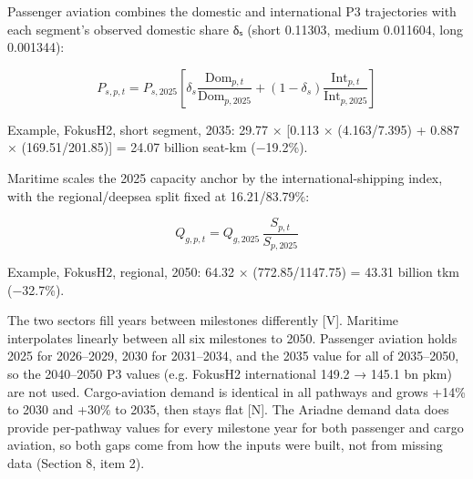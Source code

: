 \documentclass[11pt,a4paper]{article}
\begin{document}
Passenger aviation combines the domestic and international P3 trajectories with each segment's observed domestic share δₛ (short 0.11303, medium 0.011604, long 0.001344):

\[
P_{s,p,t} = P_{s,2025} \left[ \delta_s \frac{\mathrm{Dom}_{p,t}}{\mathrm{Dom}_{p,2025}} + (1-\delta_s) \frac{\mathrm{Int}_{p,t}}{\mathrm{Int}_{p,2025}} \right]
\]

Example, FokusH2, short segment, 2035: 29.77 × [0.113 × (4.163/7.395) + 0.887 × (169.51/201.85)] = 24.07 billion seat-km (−19.2\%).

Maritime scales the 2025 capacity anchor by the international-shipping index, with the regional/deepsea split fixed at 16.21/83.79\%:

\[
Q_{g,p,t} = Q_{g,2025} \, \frac{S_{p,t}}{S_{p,2025}}
\]

Example, FokusH2, regional, 2050: 64.32 × (772.85/1147.75) = 43.31 billion tkm (−32.7\%).

The two sectors fill years between milestones differently [V]. Maritime interpolates linearly between all six milestones to 2050. Passenger aviation holds 2025 for 2026–2029, 2030 for 2031–2034, and the 2035 value for all of 2035–2050, so the 2040–2050 P3 values (e.g. FokusH2 international 149.2 → 145.1 bn pkm) are not used. Cargo-aviation demand is identical in all pathways and grows +14\% to 2030 and +30\% to 2035, then stays flat [N]. The Ariadne demand data \citep{luderer2025} does provide per-pathway values for every milestone year for both passenger and cargo aviation, so both gaps come from how the inputs were built, not from missing data (Section 8, item 2).
\end{document}
